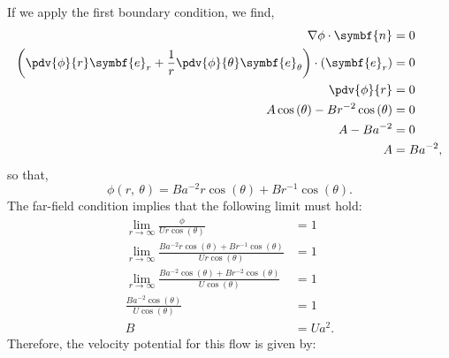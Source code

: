 \documentclass{article}
\theoremstyle{definition}
\begin{document}
If we apply the first boundary condition, we find,
\begin{align*}
    \nabla \phi \cdot \symbf{n}                                                                                                   & = 0         \\
    \left( \pdv{\phi}{r} \symbf{e}_r + \frac{1}{r} \pdv{\phi}{\theta} \symbf{e}_{\theta} \right) \cdot \left( \symbf{e}_r \right) & = 0         \\
    \pdv{\phi}{r}                                                                                                                 & = 0         \\
    A \cos{\left( \theta \right)} - B r^{-2} \cos{\left( \theta \right)}                                                          & = 0         \\
    A - B a^{-2}                                                                                                                  & = 0         \\
    A                                                                                                                             & = B a^{-2},
\end{align*}
so that,
\begin{equation*}
    \phi\left( r,\: \theta \right) = B a^{-2} r \cos{\left( \theta \right)} + B r^{-1} \cos{\left( \theta \right)}.
\end{equation*}
The far-field condition implies that the following limit must hold:
\begin{align*}
    \lim_{r \to \infty} \frac{\phi}{U r \cos{\left( \theta \right)}}                                                                          & = 1      \\
    \lim_{r \to \infty} \frac{B a^{-2} r \cos{\left( \theta \right)} + B r^{-1} \cos{\left( \theta \right)}}{U r \cos{\left( \theta \right)}} & = 1      \\
    \lim_{r \to \infty} \frac{B a^{-2} \cos{\left( \theta \right)} + B r^{-2} \cos{\left( \theta \right)}}{U \cos{\left( \theta \right)}}     & = 1      \\
    \frac{B a^{-2} \cos{\left( \theta \right)}}{U \cos{\left( \theta \right)}}                                                                & = 1      \\
    B                                                                                                                                         & = U a^2.
\end{align*}
Therefore, the velocity potential for this flow is given by:
\end{document}

